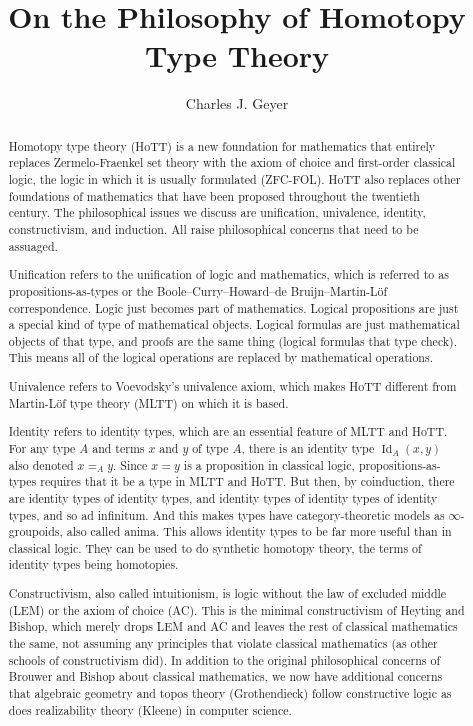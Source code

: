 \documentclass[11pt]{article}
\DeclareMathOperator{\idtype}{Id}
\begin{document}
\title{On the Philosophy of Homotopy Type Theory}
\author{Charles J. Geyer}
\maketitle


\begin{abstract}
Homotopy type theory (HoTT) is a new foundation for mathematics that
entirely replaces Zermelo-Fraenkel set theory with the axiom of choice
and first-order classical logic, the logic in which it is usually formulated
(ZFC-FOL).  HoTT also replaces other foundations of mathematics that have
been proposed throughout the twentieth century.
The philosophical issues we discuss are unification, univalence, identity,
constructivism, and induction.
All raise philosophical concerns that need to be assuaged.

Unification refers to the unification of logic and mathematics,
which is referred to as propositions-as-types or the
Boole--Curry--Howard--de Bruijn--Martin-L\"{o}f correspondence.
Logic just becomes part of mathematics.  Logical propositions are
just a special kind of type of mathematical objects.
Logical formulas are just mathematical objects of that type,
and proofs are the same thing (logical formulas that type check).
This means all of the logical operations are replaced by mathematical
operations.

Univalence refers to Voevodsky's univalence axiom,
which makes HoTT different from Martin-L\"{o}f type theory (MLTT) on which
it is based.

Identity refers to identity types, which are an essential feature of MLTT
and HoTT.  For any type $A$ and terms $x$ and $y$ of type $A$, there is
an identity type $\idtype_A(x, y)$ also denoted $x =_A y$.  Since $x = y$
is a proposition in classical logic, propositions-as-types requires that it
be a type in MLTT and HoTT.  But then, by coinduction, there are identity
types of identity types, and identity types of identity types of identity
types, and so ad infinitum.  And this makes types have category-theoretic models
as $\infty$-groupoids, also called anima.  This allows identity types to
be far more useful than in classical logic.  They can be used to do synthetic
homotopy theory, the terms of identity types being homotopies.

Constructivism, also called intuitionism, is logic without the law of excluded
middle (LEM) or the axiom of choice (AC).  This is the minimal 
constructivism of Heyting and Bishop, which merely drops LEM and AC and leaves
the rest of classical mathematics the same, not assuming any principles
that violate classical mathematics (as other schools of constructivism did).
In addition to the original philosophical concerns of Brouwer and Bishop
about classical mathematics, we now have additional concerns that algebraic
geometry and topos theory (Grothendieck) follow constructive logic as does
realizability theory (Kleene) in computer science.


\end{abstract}
\end{document}
